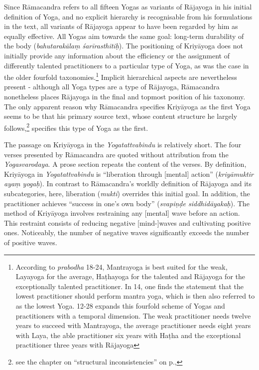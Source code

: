 Since Rāmacandra refers to all fifteen Yogas as variants of Rājayoga in his initial definition of Yoga, and no explicit hierarchy is recognisable from his formulations in the text, all variants of Rājayoga appear to have been regarded by him as equally effective. All Yogas aim towards the same goal: long-term durability of the body (\textit{bahutarakālaṃ śarīrasthitiḥ}). The positioning of Kriyāyoga does not initially provide any information about the efficiency or the assignment of differently talented practitioners to a particular type of Yoga, as was the case in the older fourfold taxonomies.\footnote{According to \textit{prabodha} 18-24, Mantrayoga is best suited for the weak, Layayoga for the average, Haṭhayoga for the talented and Rājayoga for the exceptionally talented practitioner. In  14, one finds the statement that the lowest practitioner should perform mantra yoga, which is then also referred to as the lowest Yoga.  12-28 expands this fourfold scheme of Yogas and practitioners with a temporal dimension. The weak practitioner needs twelve years to succeed with Mantrayoga, the average practitioner needs eight years with Laya, the able practitioner six years with Haṭha and the exceptional practitioner three years with Rājayoga} Implicit hierarchical aspects are nevertheless present - although all Yoga types are a type of Rājayoga, Rāmacandra nonetheless places Rājayoga in the final and topmost position of his taxonomy.
The only apparent reason why Rāmacandra specifies Kriyāyoga as the first Yoga seems to be that his primary source text, whose content structure he largely follows,\footnote{see the chapter on ``structural inconsistencies'' on p.\pageref{struktur},} specifies this type of Yoga as the first.

The passage on Kriyāyoga in the \textit{Yogatattvabindu} is relatively short. The four verses presented by Rāmacandra are quoted without attribution from the \textit{Yogasvarodaya}. A prose section repeats the content of the verses. By definition, Kriyāyoga in \textit{Yogatattvabindu} is ``liberation through [mental] action'' (\textit{kriyāmuktir ayaṃ yogaḥ}). In contrast to Rāmacandra's worldly definition of Rājayoga and its subcategories, here, liberation (\textit{mukti}) overrides this initial goal. In addition, the practitioner achieves ``success in one's own body'' (\textit{svapiṇḍe siddhidāyakaḥ}). The method of Kriyāyoga involves restraining any [mental] wave before an action. This restraint consists of reducing negative [mind-]waves and cultivating positive ones. Noticeably, the number of negative waves significantly exceeds the number of positive waves.

